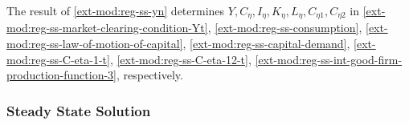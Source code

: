 \documentclass[../thesis.tex]{subfiles}
\begin{document}
\begin{comment}
Substitute \ref{ext-mod:reg-ss-C21} in \ref{ext-mod:reg-ss-C22}:
\begin{align}
	C_{22} &= C_{21} \left( \frac{1 - \omega_{21}}{\omega_{21} \theta_{P}} \right) = C_{2} \left( \frac{\omega_{21} \theta_{P}}{1 - \omega_{21}} \right)^{1 - \omega_{21}} \left( \frac{1 - \omega_{21}}{\omega_{21} \theta_{P}} \right) \tag{\ref{ext-mod:reg-ss-C22}} \implies \\
	C_{22} &= C_{2} b_{2}^{\omega_{21}} \label{ext-mod:reg-ss-C22-b}
\end{align}
	
\end{comment}








	The result of \ref{ext-mod:reg-ss-yn} determines $Y, C_{\eta}, I_{\eta}, K_{\eta}, L_{\eta}, C_{\eta 1}, C_{\eta 2}$ in 
	\ref{ext-mod:reg-ss-market-clearing-condition-Yt}, 
	\ref{ext-mod:reg-ss-consumption}, 
	\ref{ext-mod:reg-ss-law-of-motion-of-capital},
	\ref{ext-mod:reg-ss-capital-demand},
	\ref{ext-mod:reg-ss-C-eta-1-t}, 
	\ref{ext-mod:reg-ss-C-eta-12-t}, 
	\ref{ext-mod:reg-ss-int-good-firm-production-function-3}, respectively.
	

	
	
	\subsubsection{Steady State Solution}\label{sec:ext-mod-ss-solution}
	
	\vspace*{-1cm}
\end{document}
